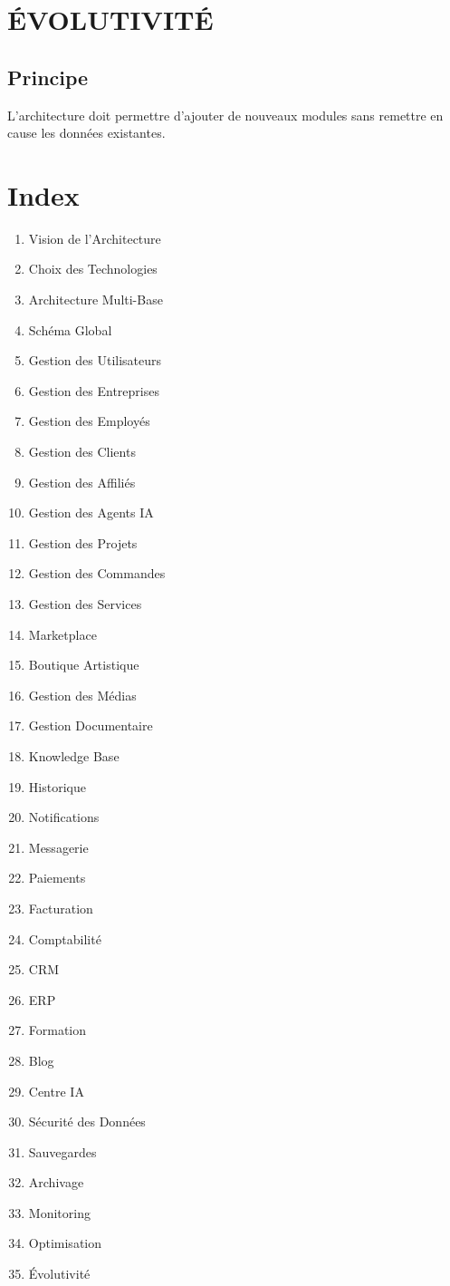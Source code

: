 \documentclass[12pt,a4paper,oneside]{book}
\begin{document}
\chapter{ÉVOLUTIVITÉ}

\section{Principe}
L'architecture doit permettre d'ajouter de nouveaux modules sans remettre en cause les données existantes.

\appendix

\chapter{Index}
\begin{enumerate}
\item Vision de l'Architecture
\item Choix des Technologies
\item Architecture Multi-Base
\item Schéma Global
\item Gestion des Utilisateurs
\item Gestion des Entreprises
\item Gestion des Employés
\item Gestion des Clients
\item Gestion des Affiliés
\item Gestion des Agents IA
\item Gestion des Projets
\item Gestion des Commandes
\item Gestion des Services
\item Marketplace
\item Boutique Artistique
\item Gestion des Médias
\item Gestion Documentaire
\item Knowledge Base
\item Historique
\item Notifications
\item Messagerie
\item Paiements
\item Facturation
\item Comptabilité
\item CRM
\item ERP
\item Formation
\item Blog
\item Centre IA
\item Sécurité des Données
\item Sauvegardes
\item Archivage
\item Monitoring
\item Optimisation
\item Évolutivité
\end{enumerate}
\end{document}

